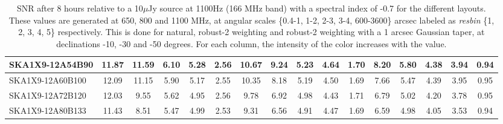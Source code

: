 \begin{table}[H]
{{\begin{tabular}{|lccccc||ccccc||ccccc|}
SKA1X9-12A54B90 & 11.87 \cellcolor{blue!56.27} & 11.59 \cellcolor{red!60.00} & 6.10 \cellcolor{green!60.00} & 5.28 \cellcolor{orange!41.90} & 2.56 \cellcolor{purple!26.40} & 10.67 \cellcolor{blue!60.00} & 9.24 \cellcolor{red!60.00} & 5.23 \cellcolor{green!49.26} & 4.64 \cellcolor{orange!39.00} & 1.70 \cellcolor{purple!22.20} & 8.20 \cellcolor{blue!60.00} & 5.80 \cellcolor{red!60.00} & 4.38 \cellcolor{green!42.75} & 3.94 \cellcolor{orange!42.60} & 0.94 \cellcolor{purple!18.00}\\ \hline 
SKA1X9-12A60B100 & 12.09 \cellcolor{blue!60.00} & 11.15 \cellcolor{red!55.17} & 5.90 \cellcolor{green!46.67} & 5.17 \cellcolor{orange!33.93} & 2.55 \cellcolor{purple!23.60} & 10.35 \cellcolor{blue!54.89} & 8.18 \cellcolor{red!43.45} & 5.19 \cellcolor{green!45.35} & 4.50 \cellcolor{orange!25.00} & 1.69 \cellcolor{purple!18.00} & 7.66 \cellcolor{blue!46.50} & 5.47 \cellcolor{red!43.10} & 4.39 \cellcolor{green!43.50} & 3.95 \cellcolor{orange!43.20} & 0.95 \cellcolor{purple!25.00}\\ \hline 
SKA1X9-12A72B120 & 12.03 \cellcolor{blue!58.98} & 9.55 \cellcolor{red!37.63} & 5.62 \cellcolor{green!28.00} & 4.95 \cellcolor{orange!18.00} & 2.56 \cellcolor{purple!26.40} & 9.78 \cellcolor{blue!45.79} & 6.92 \cellcolor{red!23.78} & 4.98 \cellcolor{green!24.84} & 4.43 \cellcolor{orange!18.00} & 1.71 \cellcolor{purple!26.40} & 6.79 \cellcolor{blue!24.75} & 5.02 \cellcolor{red!20.05} & 4.20 \cellcolor{green!29.25} & 3.78 \cellcolor{orange!33.00} & 0.95 \cellcolor{purple!25.00}\\ \hline 
SKA1X9-12A80B133 & 11.43 \cellcolor{blue!48.82} & 8.51 \cellcolor{red!26.22} & 5.47 \cellcolor{green!18.00} & 4.99 \cellcolor{orange!20.90} & 2.53 \cellcolor{purple!18.00} & 9.31 \cellcolor{blue!38.28} & 6.56 \cellcolor{red!18.16} & 4.91 \cellcolor{green!18.00} & 4.47 \cellcolor{orange!22.00} & 1.69 \cellcolor{purple!18.00} & 6.59 \cellcolor{blue!19.75} & 4.98 \cellcolor{red!18.00} & 4.05 \cellcolor{green!18.00} & 3.53 \cellcolor{orange!18.00} & 0.94 \cellcolor{purple!18.00}\\ \hline 
\end{tabular}}
\vspace{-0.300000cm}
\hspace{1cm} 

\vspace{.25cm}
\caption{SNR after 8 hours relative to a 10$\mu$Jy source at 1100Hz (166 MHz band) with a spectral index of -0.7 for the different layouts. These values are generated at 650, 800 and 1100 MHz, at angular scales \{0.4-1, 1-2, 2-3, 3-4, 600-3600\} arcsec labeled as {\it resbin} \{1, 2, 3, 4, 5\} respectively. This is done for natural, robust-2 weighting and robust-2 weighting with a 1 arcsec Gaussian taper, at declinations -10, -30 and -50 degrees. For each column, the intensity of the color increases with the value.}\label{tab:snr10}}
 \end{table}
